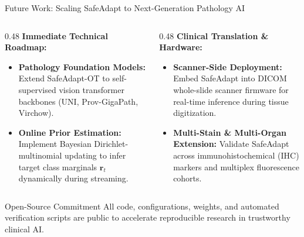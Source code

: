 \documentclass[aspectratio=169,10pt]{beamer}
\begin{document}
\begin{frame}{Future Work: Scaling SafeAdapt to Next-Generation Pathology AI}
    \begin{columns}[T]
        \begin{column}{0.48\textwidth}
            \textbf{Immediate Technical Roadmap:}
            \begin{itemize}
                \item \textbf{Pathology Foundation Models:} Extend SafeAdapt-OT to self-supervised vision transformer backbones (UNI, Prov-GigaPath, Virchow).
                \item \textbf{Online Prior Estimation:} Implement Bayesian Dirichlet-multinomial updating to infer target class marginals $\mathbf{r}_t$ dynamically during streaming.
            \end{itemize}
        \end{column}
        \begin{column}{0.48\textwidth}
            \textbf{Clinical Translation & Hardware:}
            \begin{itemize}
                \item \textbf{Scanner-Side Deployment:} Embed SafeAdapt into DICOM whole-slide scanner firmware for real-time inference during tissue digitization.
                \item \textbf{Multi-Stain & Multi-Organ Extension:} Validate SafeAdapt across immunohistochemical (IHC) markers and multiplex fluorescence cohorts.
            \end{itemize}
        \end{column}
    \end{columns}
    \vspace{0.4cm}
    \begin{block}{Open-Source Commitment}
        \centering\small
        All code, configurations, weights, and automated verification scripts are public to accelerate reproducible research in trustworthy clinical AI.
    \end{block}
\end{frame}
\end{document}
